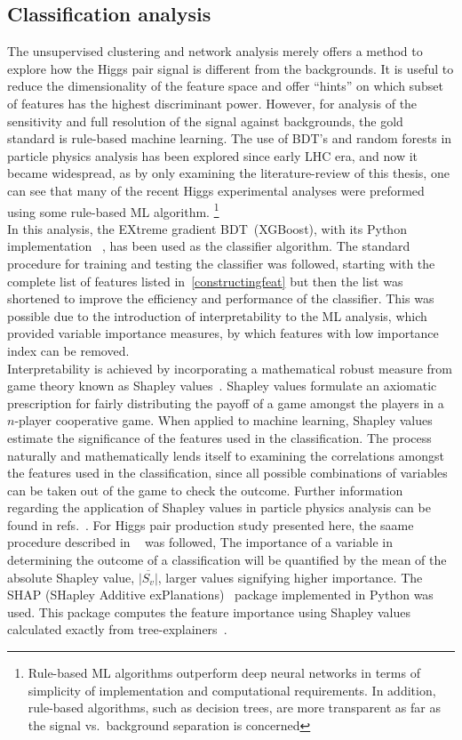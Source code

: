 \subsection{Classification analysis }
The unsupervised clustering and network analysis merely offers a method to explore how the Higgs pair signal is different from the backgrounds. It is useful to reduce the dimensionality of the feature space and offer ``hints'' on which subset of features has the highest discriminant power. However, for analysis of the sensitivity and full resolution of the signal against backgrounds, the gold standard is rule-based machine learning. 
The use of BDT's and random forests in particle physics analysis has been explored since early LHC era, and now it became widespread, as by only examining the literature-review of this thesis, one can see that many of the recent Higgs experimental analyses were preformed using some rule-based ML algorithm. \footnote{Rule-based ML algorithms outperform deep neural networks in terms of simplicity of implementation and computational requirements. In addition, rule-based algorithms, such as decision trees, are more transparent as far as the signal vs.~background separation is concerned }\\
In this analysis, the EXtreme gradient BDT~(XGBoost), with its Python implementation ~\cite{10.1145/2939672.2939785}, has been used as the classifier algorithm. The standard procedure for training and testing the classifier was followed, starting with the complete list of features listed in~\autoref{constructingfeat} but then the list was shortened to improve the efficiency and performance of the classifier. This was possible due to the introduction of interpretability to the ML analysis, which provided variable importance measures, by which features with low importance index can be removed. \\
Interpretability is achieved by incorporating a mathematical robust measure from game theory  known as Shapley values~\cite{shapley1951notes}. Shapley values formulate an axiomatic prescription for fairly distributing the payoff of a game amongst the players in a $n$-player cooperative game. When applied to machine learning, Shapley values estimate the significance of the features used in the classification. The process naturally and mathematically lends itself to examining the correlations amongst the features used in the classification, since all possible combinations of variables can be taken out of the game to check the outcome. Further information regarding the application of Shapley values in particle physics analysis can be found in refs.~\cite{Grojean:2020ech,Alvestad:2021sje,Cornell:2021gut}.  For Higgs pair production study presented here, the saame procedure described in ~\cite{Grojean:2020ech} was followed, The importance of a variable in determining the outcome of a classification will be quantified by the mean of the absolute Shapley value, $\overline{|S_v|}$, larger values signifying higher importance. The SHAP (SHapley Additive exPlanations)~\cite{NIPS2017_7062} package implemented in Python was used. This package computes the feature importance using Shapley values calculated exactly from  tree-explainers~\cite{2018arXiv180203888L,Lundberg:2020vt}.\\
